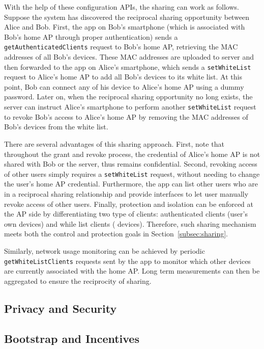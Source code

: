 With the help of these configuration APIs, the \wifi{} sharing can work as
follows. Suppose the \wisefi{} system has discovered the reciprocal sharing opportunity
between Alice and Bob. First, the \wisefi{} app on Bob's smartphone (which
is associated with Bob's home AP through proper authentication) sends a
\texttt{getAuthenticatedClients} request to Bob's home AP, retrieving the MAC
addresses of all Bob's devices. These MAC addresses are uploaded to
\wisefi{} server and then forwarded to the \wisefi{} app on Alice's smartphone,
which sends a \texttt{setWhiteList} request to Alice's home
AP to add all Bob's devices to its white list. At this point, Bob can connect any of
his device to Alice's home AP using a dummy password. Later on, when the
reciprocal sharing opportunity no long exists, the \wisefi{} server can instruct
Alice's smartphone to perform another \texttt{setWhiteList} request to revoke
Bob's access to Alice's home AP by removing the MAC addresses of Bob's devices
from the white list.

There are several advantages of this sharing approach. First, note that
throughout the grant and revoke process, the \wifi{} credential of Alice's home
AP is not shared with Bob or the \wisefi{} server, thus remains confidential.
Second, revoking access of other \wisefi{} users simply requires a
\texttt{setWhiteList} request, without needing to change the user's home AP
\wifi{} credential.  Furthermore, the \wisefi{} app can list other \wiseif{}
users who are in a reciprocal sharing relationship and provide interfaces to let
user manually revoke access of other users. Finally, protection and isolation
can be enforced at the AP side by differentiating two type of clients:
authenticated clients (user's own devices) and while list clients (\wisefi{}
devices). Therefore, such sharing mechanism meets both the control and
protection goals in Section~\ref{subsec:sharing}.

Similarly, network usage monitoring can be achieved by periodic
\texttt{getWhiteListClients} requests sent by the \wisefi{} app to monitor which
other \wisefi{} devices are currently associated with the home AP. Long term
measurements can then be aggregated to ensure the reciprocity of sharing.

\subsection{Privacy and Security}


\subsection{Bootstrap and Incentives}

